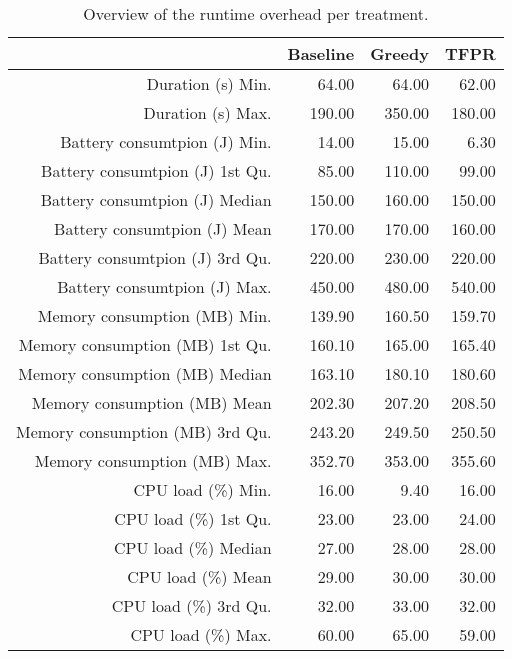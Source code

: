 \begin{table}[ht]
\centering
\begin{tabular}{rrrr}
  \hline
 & Baseline & Greedy & TFPR \\ 
  \hline
Duration (s) Min. & 64.00 & 64.00 & 62.00 \\ 
  Duration (s) Max. & 190.00 & 350.00 & 180.00 \\ 
  Battery consumtpion (J) Min. & 14.00 & 15.00 & 6.30 \\ 
  Battery consumtpion (J) 1st Qu. & 85.00 & 110.00 & 99.00 \\ 
  Battery consumtpion (J) Median & 150.00 & 160.00 & 150.00 \\ 
  Battery consumtpion (J) Mean & 170.00 & 170.00 & 160.00 \\ 
  Battery consumtpion (J) 3rd Qu. & 220.00 & 230.00 & 220.00 \\ 
  Battery consumtpion (J) Max. & 450.00 & 480.00 & 540.00 \\ 
  Memory consumption (MB) Min. & 139.90 & 160.50 & 159.70 \\ 
  Memory consumption (MB) 1st Qu. & 160.10 & 165.00 & 165.40 \\ 
  Memory consumption (MB) Median & 163.10 & 180.10 & 180.60 \\ 
  Memory consumption (MB) Mean & 202.30 & 207.20 & 208.50 \\ 
  Memory consumption (MB) 3rd Qu. & 243.20 & 249.50 & 250.50 \\ 
  Memory consumption (MB) Max. & 352.70 & 353.00 & 355.60 \\ 
  CPU load (\%) Min. & 16.00 & 9.40 & 16.00 \\ 
  CPU load (\%) 1st Qu. & 23.00 & 23.00 & 24.00 \\ 
  CPU load (\%) Median & 27.00 & 28.00 & 28.00 \\ 
  CPU load (\%) Mean & 29.00 & 30.00 & 30.00 \\ 
  CPU load (\%) 3rd Qu. & 32.00 & 33.00 & 32.00 \\ 
  CPU load (\%) Max. & 60.00 & 65.00 & 59.00 \\ 
   \hline
\end{tabular}
\caption{Overview of the runtime overhead per treatment.} 
\label{tab:results:rq1:summary:treatment}
\end{table}
